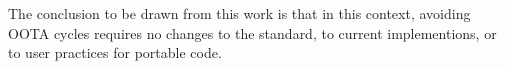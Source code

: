 The conclusion to be drawn from this work is that in this context,
avoiding OOTA cycles requires no changes to the standard,
to current implementions, or to user practices for portable code.











